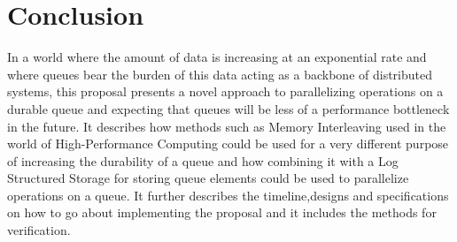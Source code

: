 \documentclass[12pt,a4paper]{article}
\begin{document}
\section{Conclusion}
In a world where the amount of data is increasing at an exponential rate and where queues bear the burden of this data acting as a backbone of distributed systems, this proposal presents a novel approach to parallelizing operations on a durable queue and expecting that queues will be less of a performance bottleneck in the future. It describes how methods such as Memory Interleaving used in the world of High-Performance Computing could be used for a very different purpose of increasing the durability of a queue and how combining it with a Log Structured Storage for storing queue elements could be used to parallelize operations on a queue. It further describes the timeline,designs and specifications on how to go about implementing the proposal and it includes the methods for verification. 



\end{document}
